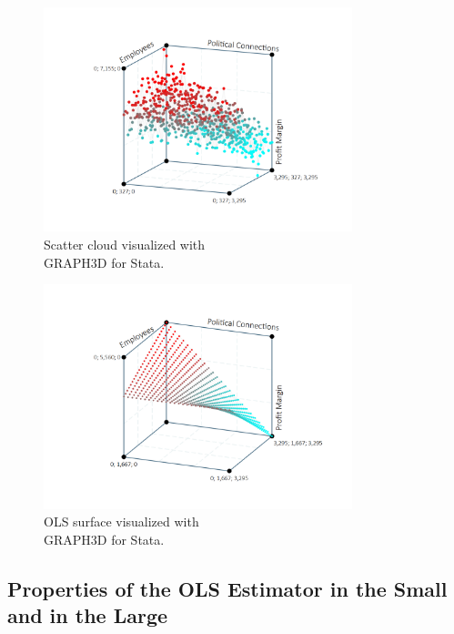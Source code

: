 \documentclass[a4paper,12pt]{article}
\begin{document}
    \begin{figure}[H]
        \centering
        \includegraphics[width=0.8\textwidth]{figures/3d_cloud1}
        \caption{ Scatter cloud visualized with\\ \textcolor{red1}{GRAPH3D for Stata}.}
        \label{fig:LRM}
    \end{figure}
    \begin{figure}[H]
        \centering
        \includegraphics[width=0.8\textwidth]{figures/3d_cloud2}
        \caption{ OLS surface visualized with\\ \textcolor{red1}{GRAPH3D for Stata}.}
        \label{fig:LRM}
    \end{figure}





\subsection{Properties of the OLS Estimator in the Small and in the Large}
\end{document}
